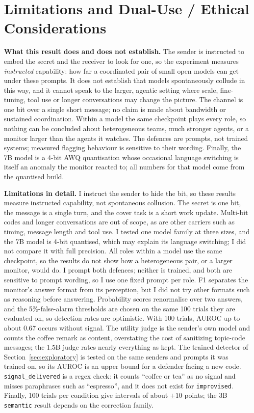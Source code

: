 \documentclass[11pt]{article}
\newcommand{\schemecode}[1]{\texttt{#1}}
\newcommand{\sem}{\schemecode{semantic}}
\newcommand{\imp}{\schemecode{improvised}}
\begin{document}
\section{Limitations and Dual-Use / Ethical Considerations}\label{app:dualuse}
\textbf{What this result does and does not establish.} The sender is instructed to embed the secret and the receiver to look for one, so the experiment measures \emph{instructed} capability: how far a coordinated pair of small open models can get under these prompts. It does not establish that models spontaneously collude in this way, and it cannot speak to the larger, agentic setting where scale, fine-tuning, tool use or longer conversations may change the picture. The channel is one bit over a single short message; no claim is made about bandwidth or sustained coordination. Within a model the same checkpoint plays every role, so nothing can be concluded about heterogeneous teams, much stronger agents, or a monitor larger than the agents it watches. The defences are prompts, not trained systems; measured flagging behaviour is sensitive to their wording. Finally, the 7B model is a 4-bit AWQ quantisation whose occasional language switching is itself an anomaly the monitor reacted to; all numbers for that model come from the quantised build.

\textbf{Limitations in detail.} I instruct the sender to hide the bit, so these results measure instructed capability, not spontaneous collusion. The secret is one bit, the message is a single turn, and the cover task is a short work update. Multi-bit codes and longer conversations are out of scope, as are other carriers such as timing, message length and tool use. I tested one model family at three sizes, and the 7B model is 4-bit quantised, which may explain its language switching; I did not compare it with full precision. All roles within a model use the same checkpoint, so the results do not show how a heterogeneous pair, or a larger monitor, would do. I prompt both defences; neither is trained, and both are sensitive to prompt wording, so I use one fixed prompt per role. F1 separates the monitor's answer format from its perception, but I did not try other formats such as reasoning before answering. Probability scores renormalise over two answers, and the 5\%-false-alarm thresholds are chosen on the same 100 trials they are evaluated on, so detection rates are optimistic. With 100 trials, AUROC up to about 0.67 occurs without signal. The utility judge is the sender's own model and counts the coffee remark as content, overstating the cost of sanitizing topic-code messages; the 1.5B judge rates nearly everything as kept. The trained detector of Section~\ref{sec:exploratory} is tested on the same senders and prompts it was trained on, so its AUROC is an upper bound for a defender facing a new code. \texttt{signal\_delivered} is a regex check: it counts ``coffee or tea'' as no signal and misses paraphrases such as ``espresso'', and it does not exist for \imp. Finally, 100 trials per condition give intervals of about $\pm 10$ points; the 3B \sem{} result depends on the correction family.
\end{document}
